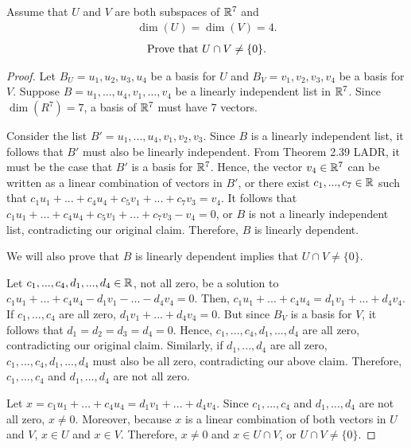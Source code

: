 \begin{question}
	\normalfont
	
	Assume that $U$ and $V$ are both subspaces of ${\mathbb R}^7$ and 
	\begin{align*}
		\dim(U)=\dim(V)=4.
	\end{align*} 
	\begin{align}\label{eq:UIntersectVStatement}
		\text{Prove that}\  U\cap V \not= \{0\}. 
	\end{align}
\end{question}

\begin{proof}
    \renewcommand{\qedsymbol}{$\blacksquare$}
    Let $B_U=u_1,u_2,u_3,u_4$ be a basis for $U$ and $B_V=v_1,v_2,v_3,v_4$ be a basis for $V$.
    Suppose $B=u_1,...,u_4,v_1,...,v_4$ be a linearly independent list in $\mathbb R^7$. Since $\dim(R^7)=7$, a basis of $\mathbb R^7$ must have 7 vectors.

    Consider the list $B'=u_1,...,u_4,v_1,v_2,v_3$. Since $B$ is a linearly independent list, it follows that $B'$ must also be linearly independent. 
    From Theorem 2.39 LADR, it must be the case that $B'$ is a basis for $\mathbb R^7$.
    Hence, the vector $v_4\in\mathbb R^7$ can be written as a linear combination of vectors in $B'$, or there exist $c_1,...,c_7\in\mathbb R$ such that $c_1u_1+...+c_4u_4+c_5v_1+...+c_7v_3=v_4$.
    It follows that $c_1u_1+...+c_4u_4+c_5v_1+...+c_7v_3-v_4=0$, or $B$ is not a linearly independent list, contradicting our original claim.
    Therefore, $B$ is linearly dependent.

    We will also prove that $B$ is linearly dependent implies that $U\cap V\not=\{0\}$.

    Let $c_1,...,c_4,d_1,...,d_4\in\mathbb R$, not all zero, be a solution to $c_1u_1+...+c_4u_4-d_1v_1-...-d_4v_4=0$.
    Then, $c_1u_1+...+c_4u_4=d_1v_1+...+d_4v_4$.
    If $c_1,...,c_4$ are all zero, $d_1v_1+...+d_4v_4=0$.
    But since $B_V$ is a basis for $V$, it follows that $d_1=d_2=d_3=d_4=0$.
    Hence, $c_1,...,c_4,d_1,...,d_4$ are all zero, contradicting our original claim.
    Similarly, if $d_1,...,d_4$ are all zero, $c_1,...,c_4,d_1,...,d_4$ must also be all zero, contradicting our above claim.
    Therefore, $c_1,...,c_4$ and $d_1,...,d_4$ are not all zero.
    
    Let $x=c_1u_1+...+c_4u_4=d_1v_1+...+d_4v_4$.
    Since $c_1,...,c_4$ and $d_1,...,d_4$ are not all zero, $x\not=0$.
    Moreover, because $x$ is a linear combination of both vectors in $U$ and $V$, $x\in U$ and $x\in V$.
    Therefore, $x\not=0$ and $x\in U\cap V$, or $U\cap V\not=\{0\}$.
\end{proof}
